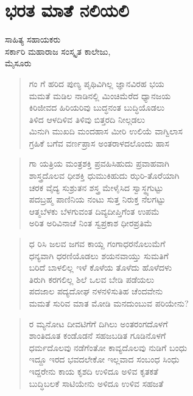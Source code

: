 \chapter{ಭರತ ಮಾತೆ ನಲಿಯಲಿ}

\begin{center}
\smallskip
ಸಾಹಿತ್ಯ ಸಹಾಯಕರು\\
ಸರ್ಕಾರಿ ಮಹಾರಾಜ ಸಂಸ್ಕೃತ ಕಾಲೇಜು,\\
ಮೈಸೂರು

\end{center}
\begin{verse}
ಗಂ ಗೆ 	ಹರಿದ 	ಪುಣ್ಯ ಪೃಥಿವಿಗಿಲ್ಲ 	ಜ್ಞಾನವಿರಹ 	ಭಯ\\
ಮಮತೆ ಮಡಿಲ ನಾಡಿನಲ್ಲಿ ಮಿಂಚಿಮೆರೆದ ಧ್ಯಾನಜಯ\\
ಕಿರಿಜೀವದ ಹಿರಿಯರಿವು ಬುದ್ಧನಂತ ಬುದ್ಧಿಯೊಡಲು\\
ತಿಳಿದ ಆಳದಿಳಿವ ತಿಳಿವು ಬಿತ್ತರದಿ ನೀಲ್ಗಡಲು\\
ಮಿನುಗಿ ಮುಖದಿ ಮಂದಹಾಸ ಮೀರಿ ಉಲಿಯೆ ವಾಗ್ವಿಲಾಸ\\
ಗ್ರಹಿಕೆ ಬಗೆವ ವರ್ಣಪ್ರಾಸ ಅಂತರಾಳದಲೊಂದು ಹಾಸ
\end{verse}
\begin{verse}
ಗಾ ಯತ್ರಿಯ ಮಂತ್ರಶಕ್ತಿ ಪ್ರವಹಿಸಿಹುದು ಪ್ರವಾಹವಾಗಿ\\
ಶಾಸ್ತ್ರದೊಲವ ಧೀಶಕ್ತಿ ಧುಮುಕಿಹುದು ಝರಿ-ತೊರೆಯಾಗಿ\\
ಚರಕ ವೈದ್ಯ ಸುಶ್ರುತನ ಶಸ್ತ್ರ ಮೇಳೈಸಿದ ಸ್ವಾಸ್ಥ್ಯಗುಟ್ಟು\\
ಪದಬ್ರಹ್ಮ ಪಾಣಿನಿಯ ನಂಟು ಸುತ್ತ ನಿರುಕ್ತ ನೆಲಗಟ್ಟು\\
ಆತ್ಮಬೆಳಕು ಬೆಳಗುವಂತ ದಿವ್ಯದೀಪ್ತಿಗೆಂತ ಉಪಮೆ\\
ಅರಿತ ಅರಿವಿನಾಚೆ ನಿಂತ ಸ್ವಪ್ರಕಾಶ ಧೀರಪ್ರತಿಮೆ
\end{verse}
\begin{verse}
ಧ ರಿಸಿ ಜಲವ ಜಗವ ಕಾಯ್ದ ಗಂಗಾಧರನೊಲುಮೆಗೆ\\
ಧನ್ಯವಾಗಿ ಧರಣಿಯೊಡಲು ಶಯನವಾಯ್ತು ಸುಮತಿಗೆ\\
ಬರಿದೆ ಬಾಳಲಿಲ್ಲ ಇಳೆ ಕೊಳೆಯ ತೊಳೆದು ಹೊಳೆದಳು\\
ತಿರುಗಿ ಕರಗಲಿಲ್ಲ ಶಿಲೆ ಒಲವ ಬೇಡಿ ಪಡೆಯಲು\\
ಪದಜಾಲ ಪದ್ಯದೋಘ ನಳನಳಿಸುತಿಹ ಚೆಂದವೇನು\\
ಮಮತೆ ಸುರಿವ ಮಾತ ಮೋಡಿ ಮನದುಂಬುವ ಪರಿಯೇನು?
\end{verse}
\begin{verse}
ರ ಮ್ಯನೋಟ ದೀವಟಿಗೆಗೆ ದಿಗಿಲು ಅಂತರಂಗದೊಳಗೆ\\
ಶಾಂತಿದೂತ ಕಂಡೊಡನೆ ಸಹಜಬಡಿತ ಗೂಡಿನೊಳಗೆ\\
ಧರ್ಮದೊಲವು ನಡೆಗೆಂತೋ ಕಾವ್ಯದೊಲವು ನುಡಿಗೆ ಬಂಧು\\
ಇದ್ದೂ ಇರದ ಭವದಲೇಕೋ ಇಲ್ಲವಾದ ಸಂಬಂಧ ಸಿಂಧು\\
ಇದ್ದರೇನು ಕಾಯ ಕೃಶದಿ ಉಳಿದೂ ಅಳಿವ ಕೃತಕತೆ\\
ಬುದ್ಧಿಬಲಕೆ ಸಾಟಿಯೇನು ಅಳಿದೂ ಉಳಿವ ಸಹಜತೆ
\end{verse}
